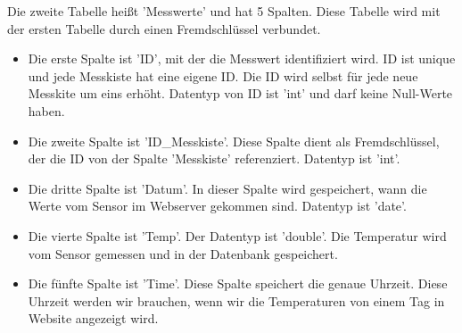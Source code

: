 	Die zweite Tabelle hei{\ss}t 'Messwerte' und hat 5 Spalten. Diese Tabelle wird mit der ersten Tabelle durch einen Fremdschl\"ussel verbundet.
	\begin{itemize}
		\item Die erste Spalte ist 'ID', mit der die Messwert identifiziert wird. ID ist unique und jede Messkiste hat eine eigene ID. Die ID wird selbst f\"ur jede neue Messkite um eins erh\"oht. Datentyp von ID ist 'int' und darf keine Null-Werte haben. 
		\item Die zweite Spalte ist 'ID\_Messkiste'. Diese Spalte dient als Fremdschl\"ussel, der die ID von der Spalte 'Messkiste' referenziert. Datentyp ist 'int'.
		\item Die dritte Spalte ist 'Datum'. In dieser Spalte wird gespeichert, wann die Werte vom Sensor im Webserver gekommen sind. Datentyp ist 'date'.
		\item Die vierte Spalte ist 'Temp'. Der Datentyp ist 'double'. Die Temperatur wird vom Sensor gemessen und in der Datenbank gespeichert.
		\item Die f\"unfte Spalte ist 'Time'. Diese Spalte speichert die genaue Uhrzeit. Diese Uhrzeit werden wir brauchen, wenn wir die Temperaturen von einem Tag in Website angezeigt wird.  
	\end{itemize}
